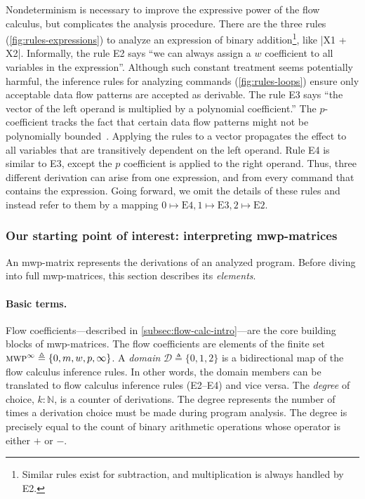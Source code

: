 Nondeterminism is necessary to improve the expressive power of the flow calculus, but complicates the analysis procedure.
There are the three rules (\autoref{fig:rules-expressions}) to analyze an expression of binary addition\footnote{
    Similar rules exist for subtraction, and multiplication is always handled by E2.}, like \pr|X1 + X2|.
Informally, the rule E2 says \enquote{we can always assign a \(w\) coefficient to all variables in the expression}.
Although such constant treatment seems  potentially harmful, the inference rules for analyzing commands (\autoref{fig:rules-loops}) ensure only acceptable data flow patterns are accepted as derivable.
The rule E3 says \enquote{the vector of the left operand is multiplied by a polynomial coefficient.}
The \(p\)-coefficient tracks the fact that certain data flow patterns might not be polynomially bounded~\cite[p. 13]{jones2009}.
Applying the rules to a vector propagates the effect to all variables that are transitively dependent on the left operand.
Rule E4 is similar to E3, except the \(p\) coefficient is applied to the right operand.
Thus, three different derivation can arise from one expression, and from every command that contains the expression.
Going forward, we omit the details of these rules and instead refer to them by a mapping \(0 \mapsto \text{E4}, 1 \mapsto \text{E3}, 2 \mapsto \text{E2}\).

\subsubsection{Our starting point of interest: interpreting mwp-matrices}
\label{subsec:mat-decode}

An mwp-matrix represents the derivations of an analyzed program.
Before diving into full mwp-matrices, this section describes its \emph{elements}.

\paragraph*{Basic terms.}
Flow coefficients---described in \autoref{subsec:flow-calc-intro}---are the core building blocks of mwp-matrices.
The flow coefficients are elements of the finite set \(\text{\textsc{mwp}}^\infty \triangleq \{0, m, w, p,\infty\}\).
A \emph{domain} \(\mathcal{D} \triangleq \{0, 1, 2 \}\) is a bidirectional map of the flow calculus inference rules.
In other words, the domain members can be translated to flow calculus inference rules (E2--E4) and vice versa.
The \emph{degree} of choice, \(k : \mathbb{N}\), is a counter of derivations.
The degree represents the number of times a derivation choice must be made during program analysis.
The degree is precisely equal to the count of binary arithmetic operations whose operator is either \(+\) or \(-\).

